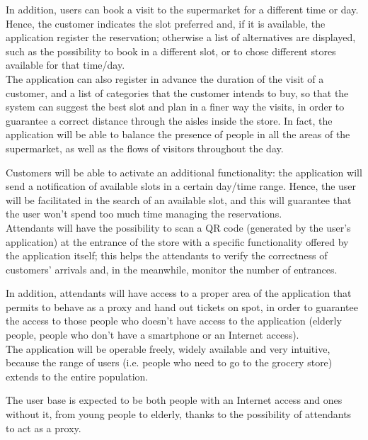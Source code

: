 \documentclass[table, 12pt]{article}
\begin{document}
\begin{flushleft}
    In addition, users can book a visit to the supermarket for a different time or day. Hence, the customer indicates the slot preferred and, if it is available, the application register the reservation; otherwise a list of alternatives are displayed, such as the possibility to book in a different slot, or to chose different stores available for that time/day.\\

    The application can also register in advance the duration of the visit of a customer, and a list of categories that the customer intends to buy, so that the system can suggest the best slot and plan in a finer way the visits, in order to guarantee a correct distance through the aisles inside the store. In fact, the application will be able to balance the presence of people in all the areas of the supermarket, as well as the flows of visitors throughout the day.

    Customers will be able to activate an additional functionality: the application will send a notification of available slots in a certain day/time range. Hence, the user will be facilitated in the search of an available slot, and this will guarantee that the user won't spend too much time managing the reservations.\\

    Attendants will have the possibility to scan a QR code (generated by the user's application) at the entrance of the store with a specific functionality offered by the application itself; this helps the attendants to verify the correctness of customers' arrivals and, in the meanwhile, monitor the number of entrances.

    In addition, attendants will have access to a proper area of the application that permits to behave as a proxy and hand out tickets on spot, in order to guarantee the access to those people who doesn't have access to the application (elderly people, people who don't have a smartphone or an Internet access).\\

    The application will be operable freely, widely available and very intuitive, because the range of users (i.e. people who need to go to the grocery store) extends to the entire population.

    The user base is expected to be both people with an Internet access and ones without it, from young people to elderly, thanks to the possibility of attendants to act as a proxy.


\end{flushleft}
\end{document}

